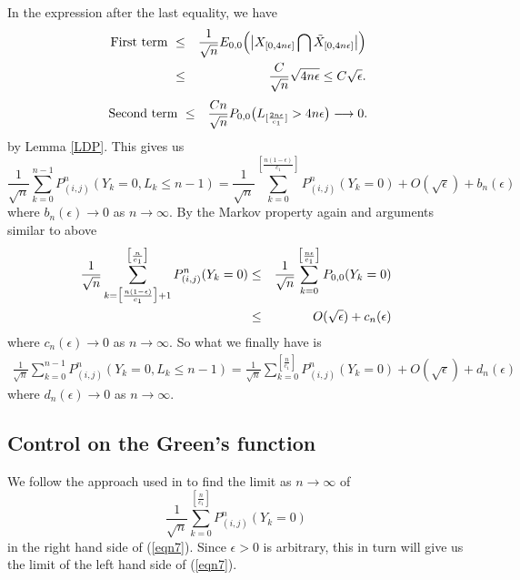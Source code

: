 \documentclass[11pt]{amsart}
\begin{document}
In the expression after the last equality, we have 
\begin{eqnarray*}
\mbox{  First term } &\leq& \frac{1}{\sqrt{n}}  E_{0,0}\Big{(}\big{\vert}X_{[0,4n\epsilon] }\bigcap \tilde{X}_{[0,4n\epsilon]}\big{\vert} \Big{)} \\
&\leq& \frac{C}{\sqrt{n}} \sqrt{ 4n\epsilon } \leq C \sqrt{\epsilon}. 
\end{eqnarray*}
\begin{eqnarray*}
 \mbox{ Second term } 
&\leq& \frac{Cn}{\sqrt{n}} P_{0,0}\big{(}L_{[\frac{2n\epsilon}{c_1}]} > 4n\epsilon \big{)} \longrightarrow 0 .
\end{eqnarray*}
by Lemma \ref{LDP}. This gives us
\[ \frac{1}{\sqrt{n}} \sum_{k=0}^{n-1} P_{(i,j)}^n(Y_k=0, L_k \leq n-1)  = \frac{1}{\sqrt{n}}\sum_{k=0}^{[\frac{n(1-\epsilon)}{c_1}]} P_{(i,j)}^n(Y_k=0 ) + O(\sqrt{\epsilon}) + b_n(\epsilon) \]
where $b_n(\epsilon) \to 0 $ as $n \to \infty$. By the Markov property again and arguments similar to above
\begin{eqnarray*}
\frac{1}{\sqrt{n}}\sum_{k=\big{[}\frac{n(1-\epsilon)}{c_1} \big{]} +1} ^{\big{[}\frac{n}{c_1} \big{]} } P_{(i,j)}^n (Y_k=0) &\le& \frac{1}{\sqrt{n}} \sum_{k=0}^{\big{[}\frac{n\epsilon}{c_1}\big{]}}
P_{0,0}(Y_k=0) \\
&\le& O(\sqrt{\epsilon}) + c_n(\epsilon)
\end{eqnarray*}
where $c_n(\epsilon) \to 0$ as $ n \to \infty$. So what we finally have is
\begin{eqnarray}
\label{eqn7}
 \frac{1}{\sqrt{n}} \sum_{k=0}^{n-1} P_{(i,j)}^n(Y_k=0, L_k \leq n-1 ) =\frac{1}{\sqrt{n}}\sum_{k=0}^{[\frac{n}{c_1}]} P_{(i,j)}^n(Y_k=0 )+ O(\sqrt{\epsilon})+d_n(\epsilon)
 \end{eqnarray}
where $d_n(\epsilon) \to 0$ as $ n \to \infty$.
 
\bigskip

\subsection{Control on the Green's function}
We follow the approach used in \cite{brs} to find the limit as $n \to \infty$ of 
\[\frac{1}{\sqrt{n}}\sum_{k=0}^{[\frac{n}{c_1}]} P_{(i,j)}^n(Y_k=0 )\]
in the right hand side of (\ref{eqn7}). Since $\epsilon>0$ is arbitrary, this in turn will give us the limit of the left hand side of (\ref{eqn7}). 
\end{document}
